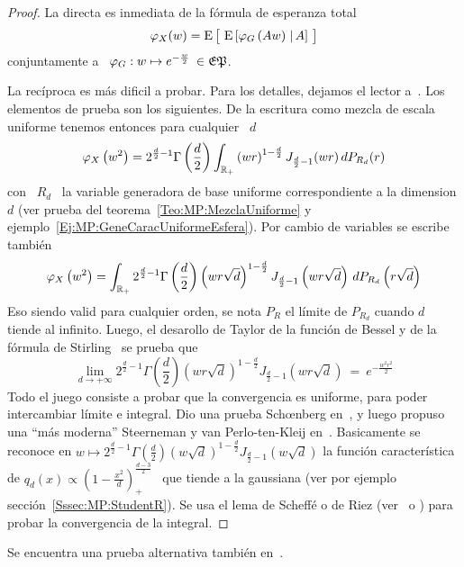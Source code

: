 \begin{proof}
  La directa es inmediata de la f\'ormula de esperanza total
  \[
  \varphi_X(w)  = \operatorname{E}\big[  \, \operatorname{E}\left[  \varphi_G\left( A  w  \right) \left.
    \right| A\right] \, \big]
  \]
  conjuntamente a \ $\varphi_G: w \mapsto e^{-\frac{w}{2}} \: \in \mathfrak{EP}$.

  La rec\'iproca es m\'as dificil a probar. Para los detalles, dejamos el lector
  a~\cite{Sch38}. Los  elementos de prueba  son los siguientes. De  la escritura
  como mezcla de escala uniforme tenemos entonces para cualquier \ $d$
  \[
  \varphi_X\left(  w^2  \right)  =  2^{\frac{d}{2}-1}  \Gamma\left(  \frac{d}{2}
  \right) \int_{\mathbb{R}_+} \left(  w r \right)^{1-\frac{d}{2}} J_{\frac{d}{2}-1}(w
  r) \, dP_{R_d}(r)
  \]
  con \  $R_d$ \ la  variable generadora de  base uniforme correspondiente  a la
  dimension   $d$   (ver   prueba  del   teorema~\ref{Teo:MP:MezclaUniforme}   y
  ejemplo~\ref{Ej:MP:GeneCaracUniformeEsfera}).  Por   cambio  de  variables  se
  escribe tambi\'en
  \[
  \varphi_X\left(  w^2 \right)  = \int_{\mathbb{R}_+}  2^{\frac{d}{2}-1} \Gamma\left(
    \frac{d}{2}   \right)   \left(    w   r   \sqrt{d}   \right)^{1-\frac{d}{2}}
  J_{\frac{d}{2}-1}\left(  w r  \sqrt{d}  \right) \,  dP_{R_d}\left( r  \sqrt{d}
  \right)
  \]
  Eso siendo valid para cualquier orden,  se nota $P_R$ el l\'imite de $P_{R_d}$
  cuando $d$ tiende al infinito.  Luego,  el desarollo de Taylor de la funci\'on
  de Bessel y de  la f\'ormula de Stirling~\cite[Ec.~8.402~y~8.327]{GraRyz15} se
  prueba que
  \[
  \lim_{d \to +\infty} 2^{\frac{d}{2}-1} \Gamma\left( \frac{d}{2} \right) \left(
    w  r \sqrt{d} \right)^{1-\frac{d}{2}}  J_{\frac{d}{2}-1}\left( w  r \sqrt{d}
  \right) \: = \: e^{-\frac{w^2 r^2}{2}}
  \]
  Todo el  juego consiste a probar  que la convergencia es  uniforme, para poder
  intercambiar   l\'imite   e    integral.    Dio   una   prueba   Sch{\oe}nberg
  en~\cite{Sch38},  y  luego propuso  una  ``m\'as  moderna''  Steerneman y  van
  Perlo-ten-Kleij  en~\cite{SteVan05}.  Basicamente  se reconoce  en  $w \mapsto
  2^{\frac{d}{2}-1}   \Gamma\left(  \frac{d}{2}   \right)   \left(  w   \sqrt{d}
  \right)^{1-\frac{d}{2}}   J_{\frac{d}{2}-1}\left(  w   \sqrt{d}   \right)$  la
  funci\'on  caracter\'istica  de  $q_d(x)  \propto  \left(  1  -  \frac{x^2}{d}
  \right)_+^{\frac{d-3}{2}}$  \  que tiende  a  la  gaussiana  (ver por  ejemplo
  secci\'on~\ref{Sssec:MP:StudentR}).   Se usa el  lema de  Scheff\'e o  de Riez
  (ver~\cite{Rie28,  Sch47, Nov72,  Kus10} o  \cite{AthLah06,  Bog07:v1, Bil12})
  para probar la convergencia de la integral.
\end{proof}
%
\noindent  Se  encuentra  una  prueba alternativa  tambi\'en  en~\cite{FanKot90,
  Kin72}.

